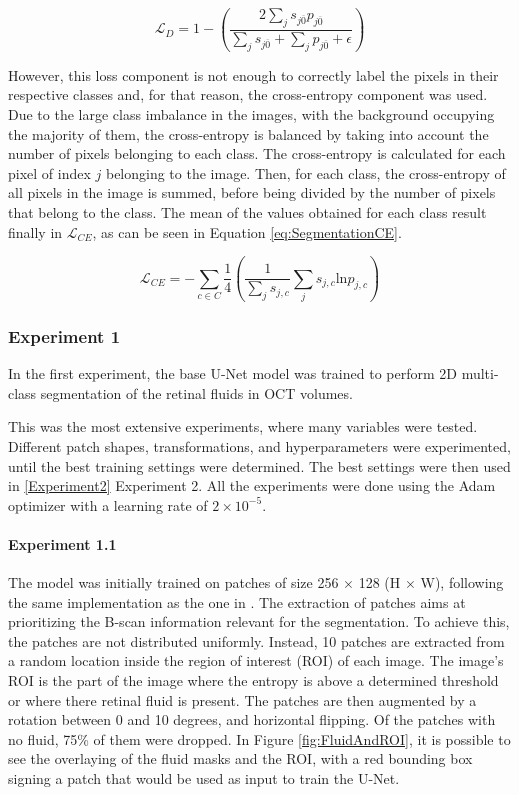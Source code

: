 \begin{equation}
	\mathcal{L}_{D} = 1 - \left( \frac{2 \sum_{j} s_{j\overline{0}} p_{j\overline{0}}}{\sum_{j} s_{j\overline{0}} + \sum_{j} p_{j\overline{0}} + \epsilon} \right)
	\label{eq:SegmentationDice}
\end{equation}

However, this loss component is not enough to correctly label the pixels in their respective classes and, for that reason, the cross-entropy component was used. Due to the large class imbalance in the images, with the background occupying the majority of them, the cross-entropy is balanced by taking into account the number of pixels belonging to each class. The cross-entropy is calculated for each pixel of index $j$ belonging to the image. Then, for each class, the cross-entropy of all pixels in the image is summed, before being divided by the number of pixels that belong to the class. The mean of the values obtained for each class result finally in $\mathcal{L}_{CE}$, as can be seen in Equation \ref{eq:SegmentationCE}.

\begin{equation}
	\mathcal{L}_{CE} = - \sum_{c \in C} \frac{1}{4}\left( \frac{1}{\sum_{j} s_{j,c}} \sum_{j} s_{j,c} \text{ln} p_{j,c} \right)
	\label{eq:SegmentationCE}
\end{equation}

\subsubsection{Experiment 1}
In the first experiment, the base U-Net model was trained to perform 2D multi-class segmentation of the retinal fluids in OCT volumes.
\par
This was the most extensive experiments, where many variables were tested. Different patch shapes, transformations, and hyperparameters were experimented, until the best training settings were determined. The best settings were then used in \ref{Experiment2} Experiment 2. All the experiments were done using the Adam optimizer \parencite{Kingma2017} with a learning rate of $2 \times 10^{-5}$.

\paragraph{Experiment 1.1}
The model was initially trained on patches of size 256 $\times$ 128 (H $\times$ W), following the same implementation as the one in \textcite{Tennakoon2018}. The extraction of patches aims at prioritizing the B-scan information relevant for the segmentation. To achieve this, the patches are not distributed uniformly. Instead, 10 patches are extracted from a random location inside the region of interest (ROI) of each image. The image's ROI is the part of the image where the entropy is above a determined threshold or where there retinal fluid is present. The patches are then augmented by a rotation between 0 and 10 degrees, and horizontal flipping. Of the patches with no fluid, 75\% of them were dropped. In Figure \ref{fig:FluidAndROI}, it is possible to see the overlaying of the fluid masks and the ROI, with a red bounding box signing a patch that would be used as input to train the U-Net.

